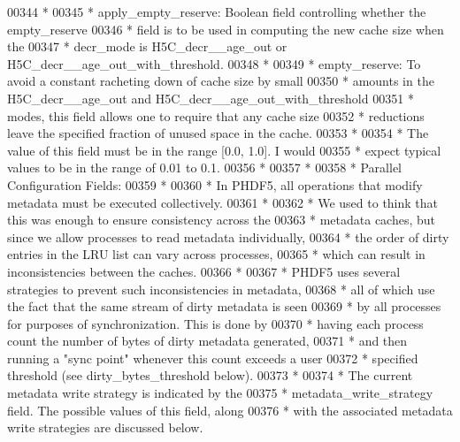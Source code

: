 \begin{DoxyCode}
00344 \textcolor{comment}{ *}
00345 \textcolor{comment}{ * apply\_empty\_reserve:  Boolean field controlling whether the empty\_reserve}
00346 \textcolor{comment}{ *      field is to be used in computing the new cache size when the}
00347 \textcolor{comment}{ *      decr\_mode is H5C\_decr\_\_age\_out or H5C\_decr\_\_age\_out\_with\_threshold.}
00348 \textcolor{comment}{ *}
00349 \textcolor{comment}{ * empty\_reserve:  To avoid a constant racheting down of cache size by small}
00350 \textcolor{comment}{ *      amounts in the H5C\_decr\_\_age\_out and H5C\_decr\_\_age\_out\_with\_threshold}
00351 \textcolor{comment}{ *      modes, this field allows one to require that any cache size}
00352 \textcolor{comment}{ *      reductions leave the specified fraction of unused space in the cache.}
00353 \textcolor{comment}{ *}
00354 \textcolor{comment}{ *      The value of this field must be in the range [0.0, 1.0].  I would}
00355 \textcolor{comment}{ *      expect typical values to be in the range of 0.01 to 0.1.}
00356 \textcolor{comment}{ *}
00357 \textcolor{comment}{ *}
00358 \textcolor{comment}{ * Parallel Configuration Fields:}
00359 \textcolor{comment}{ *}
00360 \textcolor{comment}{ * In PHDF5, all operations that modify metadata must be executed collectively.}
00361 \textcolor{comment}{ *}
00362 \textcolor{comment}{ * We used to think that this was enough to ensure consistency across the}
00363 \textcolor{comment}{ * metadata caches, but since we allow processes to read metadata individually,}
00364 \textcolor{comment}{ * the order of dirty entries in the LRU list can vary across processes,}
00365 \textcolor{comment}{ * which can result in inconsistencies between the caches.}
00366 \textcolor{comment}{ *}
00367 \textcolor{comment}{ * PHDF5 uses several strategies to prevent such inconsistencies in metadata,}
00368 \textcolor{comment}{ * all of which use the fact that the same stream of dirty metadata is seen}
00369 \textcolor{comment}{ * by all processes for purposes of synchronization.  This is done by }
00370 \textcolor{comment}{ * having each process count the number of bytes of dirty metadata generated,}
00371 \textcolor{comment}{ * and then running a "sync point" whenever this count exceeds a user }
00372 \textcolor{comment}{ * specified threshold (see dirty\_bytes\_threshold below).}
00373 \textcolor{comment}{ *}
00374 \textcolor{comment}{ * The current metadata write strategy is indicated by the }
00375 \textcolor{comment}{ * metadata\_write\_strategy field.  The possible values of this field, along}
00376 \textcolor{comment}{ * with the associated metadata write strategies are discussed below.}

\end{DoxyCode}
